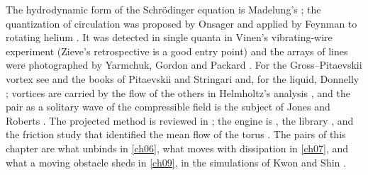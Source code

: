 The hydrodynamic form of the Schr\"odinger equation is Madelung's \cite{Madelung1927}; the quantization of circulation was proposed by Onsager \cite{Onsager1949} and applied by Feynman to rotating helium \cite{Feynman1955}. It was detected in single quanta in Vinen's vibrating-wire experiment \cite{Vinen1961} (Zieve's retrospective \cite{Zieve2023} is a good entry point) and the arrays of lines were photographed by Yarmchuk, Gordon and Packard \cite{Yarmchuk1979}. For the Gross--Pitaevskii vortex see \cite{Gross1961,Pitaevskii1961} and the books of Pitaevskii and Stringari \cite{PitaevskiiStringari2016} and, for the liquid, Donnelly \cite{Donnelly1991}; vortices are carried by the flow of the others in Helmholtz's analysis \cite{Helmholtz1858}, and the pair as a solitary wave of the compressible field is the subject of Jones and Roberts \cite{JonesRoberts1982}. The projected method is reviewed in \cite{Blakie2008}; the engine is \cite{Callens2026sw}, the library \cite{Callens2026lib}, and the friction study that identified the mean flow of the torus \cite{Callens2026a}. The pairs of this chapter are what unbinds in \cref{ch06}, what moves with dissipation in \cref{ch07}, and what a moving obstacle sheds in \cref{ch09}, in the simulations of Kwon and Shin \cite{KwonShin2026prr}.

\setlength{\emergencystretch}{\cthreeOldES}
\let\topfraction\cthreeOldTopFrac\let\textfraction\cthreeOldTextFrac\let\floatpagefraction\cthreeOldFloatFrac
